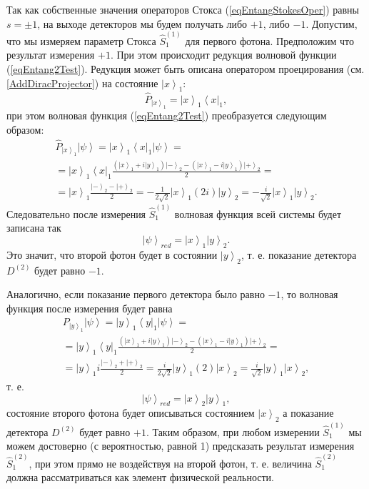 Так как собственные значения операторов Стокса
(\ref{eqEntangStokesOper}) равны $s = \pm 1$, на выходе детекторов мы
будем получать либо $+1$, либо $-1$. Допустим, что мы измеряем параметр
Стокса $\hat{S}_1^{(1)}$ для первого фотона. Предположим что
результат измерения $+1$. При этом происходит редукция волновой функции
(\ref{eqEntang2Test}). Редукция может быть описана оператором
проецирования (см. \autoref{AddDiracProjector}) на состояние
$\left|x\right>_1$:
\[
\hat{P}_{\left|x\right>_1} = \left|x\right>_1\left<x\right|_1,
\]
при этом волновая функция
(\ref{eqEntang2Test}) преобразуется следующим образом:
\begin{eqnarray}
  \hat{P}_{\left|x\right>_1}\left|\psi\right> =
  \left|x\right>_1\left<x\right|_1 \left|\psi\right> =
  \nonumber \\
    =
  \left|x\right>_1\left<x\right|_1
  \frac{
    \left( \left|x\right>_1 + i \left|y\right>_1 \right)\left| - \right>_2 -
    \left( \left|x\right>_1 - i \left|y\right>_1 \right)\left| + \right>_2
  }{2} =
  \nonumber \\
  =
  \left|x\right>_1
  \frac{\left| - \right>_2 - \left| + \right>_2}{2} = -
  \frac{1}{2\sqrt{2}}\left|x\right>_1 \left(2 i\right)
  \left|y\right>_2 = -
  \frac{i}{\sqrt{2}}\left|x\right>_1\left|y\right>_2.
\nonumber
\end{eqnarray}
Следовательно после измерения $\hat{S}_1^{(1)}$ волновая функция всей
системы будет записана так
\[
\left|\psi\right>_{red} = \left|x\right>_1\left|y\right>_2.
\]
Это значит, что второй фотон будет в состоянии $\left|y\right>_2$,
т. е.  показание детектора $D^{(2)}$ будет равно $-1$.

Аналогично, если показание первого детектора было равно $-1$, то
волновая функция после измерения будет равна
\begin{eqnarray}
  P_{\left|y\right>_1}\left|\psi\right> =
  \left|y\right>_1\left<y\right|_1 \left|\psi\right> =
  \nonumber \\
  =
  \left|y\right>_1\left<y\right|_1
  \frac{
    \left( \left|x\right>_1 + i \left|y\right>_1 \right)\left| - \right>_2 -
    \left( \left|x\right>_1 - i \left|y\right>_1 \right)\left| + \right>_2
  }{2} =
  \nonumber \\
  =
  \left|y\right>_1 i 
  \frac{\left| - \right>_2 + \left| + \right>_2}{2} =
  \frac{i}{2\sqrt{2}}\left|y\right>_1 \left(2\right)
  \left|x\right>_2 =
  \frac{i}{\sqrt{2}}\left|y\right>_1\left|x\right>_2,
  \nonumber
\end{eqnarray}
т. е.
\[
\left|\psi\right>_{red} = \left|x\right>_2\left|y\right>_1,
\]
состояние второго фотона будет описываться состоянием
$\left|x\right>_2$ а показание детектора $D^{(2)}$ будет равно $+1$.
Таким образом, при любом измерении $\hat{S}_1^{(1)}$ мы можем
достоверно (с вероятностью, равной 1) предсказать результат измерения
$\hat{S}_1^{(2)}$, при этом прямо не воздействуя на второй фотон, т. е.
величина $\hat{S}_1^{(2)}$ должна рассматриваться как элемент
физической реальности.

